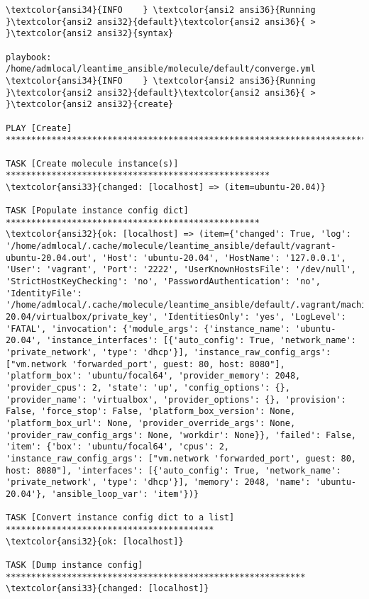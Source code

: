 \documentclass{scrartcl}
\begin{document}
\begin{Verbatim}
\textcolor{ansi34}{INFO    } \textcolor{ansi2 ansi36}{Running }\textcolor{ansi2 ansi32}{default}\textcolor{ansi2 ansi36}{ > }\textcolor{ansi2 ansi32}{syntax}

playbook: /home/admlocal/leantime_ansible/molecule/default/converge.yml
\textcolor{ansi34}{INFO    } \textcolor{ansi2 ansi36}{Running }\textcolor{ansi2 ansi32}{default}\textcolor{ansi2 ansi36}{ > }\textcolor{ansi2 ansi32}{create}

PLAY [Create] *************************************************************************

TASK [Create molecule instance(s)] ****************************************************
\textcolor{ansi33}{changed: [localhost] => (item=ubuntu-20.04)}

TASK [Populate instance config dict] **************************************************
\textcolor{ansi32}{ok: [localhost] => (item={'changed': True, 'log': '/home/admlocal/.cache/molecule/leantime_ansible/default/vagrant-ubuntu-20.04.out', 'Host': 'ubuntu-20.04', 'HostName': '127.0.0.1', 'User': 'vagrant', 'Port': '2222', 'UserKnownHostsFile': '/dev/null', 'StrictHostKeyChecking': 'no', 'PasswordAuthentication': 'no', 'IdentityFile': '/home/admlocal/.cache/molecule/leantime_ansible/default/.vagrant/machines/ubuntu-20.04/virtualbox/private_key', 'IdentitiesOnly': 'yes', 'LogLevel': 'FATAL', 'invocation': {'module_args': {'instance_name': 'ubuntu-20.04', 'instance_interfaces': [{'auto_config': True, 'network_name': 'private_network', 'type': 'dhcp'}], 'instance_raw_config_args': ["vm.network 'forwarded_port', guest: 80, host: 8080"], 'platform_box': 'ubuntu/focal64', 'provider_memory': 2048, 'provider_cpus': 2, 'state': 'up', 'config_options': {}, 'provider_name': 'virtualbox', 'provider_options': {}, 'provision': False, 'force_stop': False, 'platform_box_version': None, 'platform_box_url': None, 'provider_override_args': None, 'provider_raw_config_args': None, 'workdir': None}}, 'failed': False, 'item': {'box': 'ubuntu/focal64', 'cpus': 2, 'instance_raw_config_args': ["vm.network 'forwarded_port', guest: 80, host: 8080"], 'interfaces': [{'auto_config': True, 'network_name': 'private_network', 'type': 'dhcp'}], 'memory': 2048, 'name': 'ubuntu-20.04'}, 'ansible_loop_var': 'item'})}

TASK [Convert instance config dict to a list] *****************************************
\textcolor{ansi32}{ok: [localhost]}

TASK [Dump instance config] ***********************************************************
\textcolor{ansi33}{changed: [localhost]}


\end{Verbatim}
\end{document}
